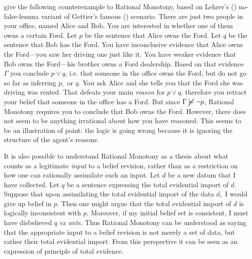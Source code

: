 \citet{lin2019correspondence} give the following counterexample to Rational
Monotony, based on Lehrer's () no-false-lemma
variant of Gettier's famous () scenario.
There are just two people in your office, named Alice and Bob. You are
interested in whether one of them owns a certain Ford. Let $p$ be the sentence
that Alice owns the Ford. Let $q$ be the sentence that Bob has the Ford. You
have inconclusive evidence that Alice owns the Ford---you saw her driving one
just like it. You have weaker evidence that Bob owns the Ford---his brother owns
a Ford dealership. Based on that evidence $\Gamma$ you conclude $p\vee q$, i.e.
that someone in the office owns the Ford, but do not go so far as inferring $p,$
or $q$. You ask Alice and she tells you that the Ford she was driving was
rented. That defeats your main {\em reason} for $p\vee q$, therefore you retract
your belief that someone in the office has a Ford. But since $\Gamma \mathrel{\cancel{\mathrel{\mid\hspace{-.08em}\!\sim}}} \neg
p$,  Rational Monotony requires you to conclude that Bob owns the Ford. However,
there does not seem to be anything irrational about how you have reasoned. This
seems to be an illustration of  point: the logic
is going wrong because it is ignoring the structure of the agent's reasons.

It is also possible to understand Rational Monotony as a thesis about what
counts as a legitimate {\em input} to a belief revision, rather than as a
restriction on how one can rationally assimilate such an input. Let $d$ be a new
datum that I have collected. Let $q$ be a sentence expressing the total
evidential import of $d$. Suppose that upon assimilating the total evidential
import of the data $d,$ I would give up belief in $p.$ Then one might argue that
the total evidential import of $d$ is logically inconsistent with $p$. Moreover,
if my initial belief set is consistent, I must have disbelieved $q$ {\em ex
ante}. Thus Rational Monotony can be understood as saying that the appropriate
input to a belief revision is not merely a set of data, but rather their total
evidential import. From this perspective it can be seen as an expression of
 principle of total evidence.

